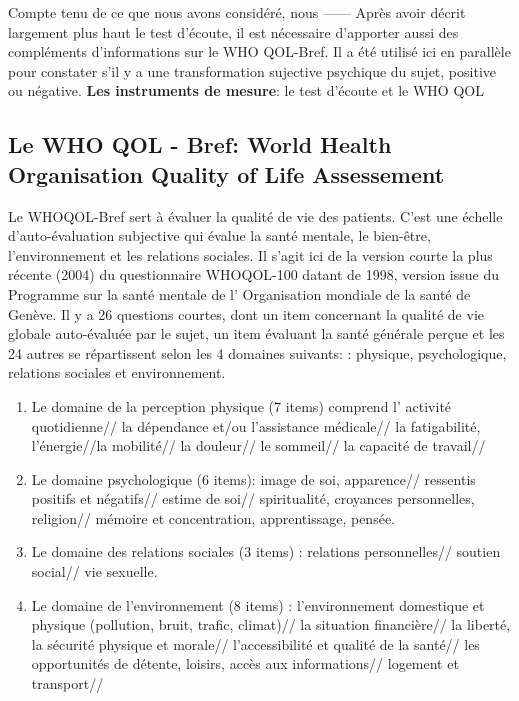 Compte tenu de ce que nous avons considéré, nous ------
 Après avoir décrit largement plus haut le test d'écoute, il est nécessaire d'apporter aussi des compléments d'informations sur le WHO QOL-Bref. Il a été
 utilisé ici en parallèle pour constater s'il y a une transformation sujective psychique du sujet,
 positive ou négative.
\textbf{ Les instruments de mesure}: le test  d'écoute et le WHO QOL

 \subsection{Le WHO QOL - Bref:  World Health
   Organisation Quality of Life Assessement }
 Le  WHOQOL-Bref sert à évaluer la qualité de vie des patients. C'est une échelle
d'auto-évaluation subjective qui évalue la santé mentale, le
bien-être, l'environnement et les relations sociales.
Il s'agit ici de la version courte  la plus récente (2004) du questionnaire
 WHOQOL-100 datant de 1998, version issue du Programme sur la santé
 mentale de l'
Organisation mondiale de la santé de Genève. Il y a 26 questions
courtes, dont un item concernant la qualité de vie globale
auto-évaluée par le sujet, un item évaluant la santé générale perçue
et les 24 autres se répartissent selon les 4 domaines suivants:  
: physique, psychologique, relations sociales et environnement.
\begin{enumerate}
\item  Le domaine de la perception physique (7 items) comprend l' activité quotidienne// la dépendance et/ou l'assistance médicale// la fatigabilité, l'énergie//la mobilité// la douleur// le sommeil// la capacité de travail//
	
\item Le domaine psychologique (6 items):  image de soi, apparence// ressentis positifs et négatifs// estime de soi// spiritualité, croyances personnelles, religion// mémoire et concentration, apprentissage, pensée.
		
\item Le domaine des relations sociales (3 items) : relations personnelles// soutien social// vie sexuelle.
			
\item Le domaine de l'environnement (8 items) :
                         l'environnement domestique et physique
                         (pollution, bruit, trafic, climat)// la
                         situation financière//  la liberté, la
                         sécurité physique et morale//
                         l'accessibilité et qualité de la santé// les
                         opportunités de détente, loisirs, accès aux
                         informations// logement et transport// 
\end{enumerate}
		

